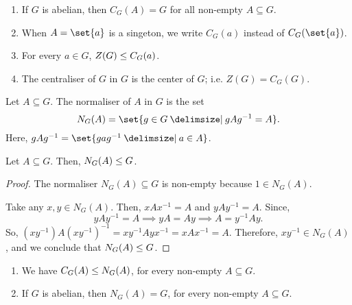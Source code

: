 \documentclass[11pt]{penrose}
\begin{document}
\begin{remark}\phantom{}
    \begin{enumerate}
        \item If $G$ is abelian, then $C_{G}(A) = G$ for all non-empty $A \subseteq G$.
        \item When $A = \set{a}$ is a singeton, we write $C_{G}(a)$ instead of $C_{G}(\set{a})$.
        \item For every $a \in G$, $Z(G) \mathrel{\leq} C_{G}(a)$.
        \item The centraliser of $G$ in $G$ is the center of $G$; i.e. $Z(G) = C_{G}(G)$.
    \end{enumerate}
\end{remark}

\begin{ndfn}
    Let $A \subseteq G$. The normaliser of $A$ in $G$ is the set
    \begin{equation*}
        N_{G}(A) = \set{ g \in G \st g A g^{-1} = A}.
    \end{equation*}
    Here, $g A g^{-1} = \set{g a g^{-1} \st a \in A}$.
\end{ndfn}

\begin{nprop}
    Let $A \subseteq G$. Then, $N_{G}(A) \mathrel{\leq} G$.
\end{nprop}
\begin{proof}
    The normaliser $N_{G}(A) \subseteq G$ is non-empty because $1 \in N_{G}(A)$.

    Take any $x, y \in N_{G}(A)$. Then, $xAx^{-1} = A$ and $yAy^{-1} = A$. Since,
    \begin{equation*}
        yAy^{-1} = A
        \implies
        yA = Ay
        \implies
        A = y^{-1}Ay.
    \end{equation*}
    So, $(xy^{-1}) A (xy^{-1})^{-1} = x y^{-1} A y x^{-1} = x A x^{-1} = A$. Therefore, $xy^{-1} \in N_{G}(A)$, and we conclude that $N_{G}(A) \mathrel{\leq} G$.
\end{proof}

\begin{remark}
    \phantom{}
    \begin{enumerate}
        \item We have $C_{G}(A) \mathrel{\leq} N_{G}(A)$, for every non-empty $A \subseteq G$.
        \item If $G$ is abelian, then $N_{G}(A) = G$, for every non-empty $A \subseteq G$.
    \end{enumerate}
\end{remark}
\end{document}
